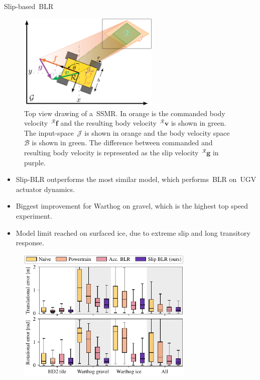 \documentclass[final,hyperref={pdfpagelabels=false}]{beamer}
\newcommand{\CMDBODYVEL}{^{\robotf}\bm{f}}
\newcommand{\SLIPBODYVEL}{^{\robotf}\bm{g}}
\newcommand{\INPUTSPACE}{\mathcal{J}}
\newcommand{\BODYVELSPACE}{\mathcal{B}}
\newcommand{\robotf}{\mathcal{R}} %
\begin{document}
\begin{frame}[t]
\begin{columns}[t]
\begin{column}{.465\textwidth}
\begin{block}{Slip-based~\acf{BLR}}
	\begin{figure}%
		\includegraphics[width=0.6\textwidth]{./figures/Figure_2_final_no_margin-1.pdf}
		\hfill
		\begin{minipage}[b]{.35\textwidth}%
			\caption{
				Top view drawing of a~\ac{SSMR}.
				In orange is the commanded body velocity~$\CMDBODYVEL$ and the resulting body velocity~$^{\robotf}\bm{v}$ is shown in green.
				The input-space~$\INPUTSPACE$ is shown in orange and the body velocity space~$\BODYVELSPACE$ is shown in green.
				The difference between commanded and resulting body velocity is represented as the slip velocity~$\SLIPBODYVEL$ in purple.
			}
		\end{minipage}%
	\end{figure}	
	\begin{itemize}
		\item Slip-\ac{BLR} outperforms the most similar model, which performs~\ac{BLR} on~\ac{UGV} actuator dynamics.
		\item Biggest improvement for Warthog on gravel, which is the highest top speed experiment.
		\item Model limit reached on surfaced ice, due to extreme slip and long transitory response.
	\end{itemize}
	\begin{figure}%
		\includegraphics[width=0.75\textwidth]{./figures/prediction_errors_BLR_cg_v3.pdf}

\end{figure}
\end{block}
\end{column}
\end{columns}
\end{frame}
\end{document}
